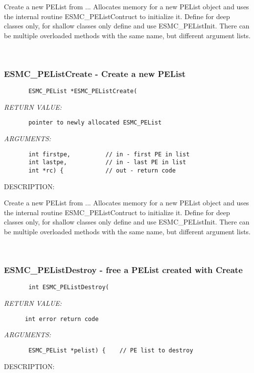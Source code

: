         Create a new PEList from ... Allocates memory for a new PEList
        object and uses the internal routine ESMC\_PEListContruct to
        initialize it.  Define for deep classes only, for shallow classes only
        define and use ESMC\_PEListInit.
        There can be multiple overloaded methods with the same name, but
        different argument lists.
   
 
\mbox{}\hrulefill\ 
 
\subsubsection{ESMC\_PEListCreate - Create a new PEList}


  
\begin{verbatim}       ESMC_PEList *ESMC_PEListCreate(\end{verbatim}{\em RETURN VALUE:}
\begin{verbatim}       pointer to newly allocated ESMC_PEList\end{verbatim}{\em ARGUMENTS:}
\begin{verbatim}       int firstpe,          // in - first PE in list
       int lastpe,           // in - last PE in list
       int *rc) {            // out - return code\end{verbatim}
{\sf DESCRIPTION:\\ }


        Create a new PEList from ... Allocates memory for a new PEList
        object and uses the internal routine ESMC\_PEListContruct to
        initialize it.  Define for deep classes only, for shallow classes only
        define and use ESMC\_PEListInit.
        There can be multiple overloaded methods with the same name, but
        different argument lists.
   
 
\mbox{}\hrulefill\ 
 
\subsubsection{ESMC\_PEListDestroy - free a PEList created with Create}


  
\begin{verbatim}       int ESMC_PEListDestroy(\end{verbatim}{\em RETURN VALUE:}
\begin{verbatim}      int error return code\end{verbatim}{\em ARGUMENTS:}
\begin{verbatim}       ESMC_PEList *pelist) {    // PE list to destroy\end{verbatim}
{\sf DESCRIPTION:\\ }


